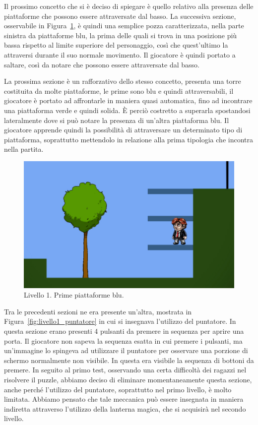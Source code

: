 Il prossimo concetto che si è deciso di spiegare è quello relativo alla presenza delle piattaforme che possono essere attraversate dal basso.
La successiva sezione, osservabile in Figura~\ref{fig:livello1_piattaforme_blu}, è quindi una semplice pozza caratterizzata, nella parte sinistra da piattaforme blu, la prima delle quali si trova in una posizione più bassa rispetto al limite superiore del personaggio, così che quest’ultimo la attraversi durante il suo normale movimento. Il giocatore è quindi portato a saltare, così da notare che possono essere attraversate dal basso.

La prossima sezione è un rafforzativo dello stesso concetto, presenta una torre costituita da molte piattaforme, le prime sono blu e quindi attraversabili, il giocatore è portato ad affrontarle in maniera quasi automatica, fino ad incontrare una piattaforma verde e quindi solida. È perciò costretto a superarla spostandosi lateralmente dove si può notare la presenza di un’altra piattaforma blu. Il giocatore apprende quindi la possibilità di attraversare un determinato tipo di piattaforma, soprattutto mettendolo in relazione alla prima tipologia che incontra nella partita.

\begin{figure}%
	\centering
	\includegraphics[width= 0.55\columnwidth]{images/gameDesign/44_blu.jpg}
	\caption{Livello 1. Prime piattaforme blu.}
	\label{fig:livello1_piattaforme_blu}
\end{figure}

Tra le precedenti sezioni ne era presente un’altra, mostrata in Figura~\ref{fig:livello1_puntatore} in cui si insegnava l’utilizzo del puntatore. In questa sezione erano presenti 4 pulsanti da premere in sequenza per aprire una porta. Il giocatore non sapeva la sequenza esatta in cui premere i pulsanti, ma un’immagine lo spingeva ad utilizzare il puntatore per osservare una porzione di schermo normalmente non visibile. In questa era visibile la sequenza di bottoni da premere. In seguito al primo test, osservando una certa difficoltà dei ragazzi nel risolvere il puzzle, abbiamo deciso di eliminare momentaneamente questa sezione, anche perché l’utilizzo del puntatore, soprattutto nel primo livello, è molto limitata. Abbiamo pensato che tale meccanica può essere insegnata in maniera indiretta attraverso l’utilizzo della lanterna magica, che si acquisirà nel secondo livello.

